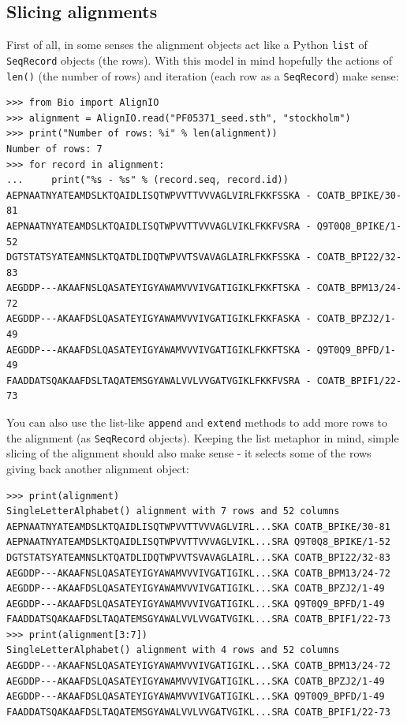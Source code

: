 \documentclass{report}
\begin{document}
\subsection{Slicing alignments}
First of all, in some senses the alignment objects act like a Python \verb|list| of
\verb|SeqRecord| objects (the rows). With this model in mind hopefully the actions
of \verb|len()| (the number of rows) and iteration (each row as a \verb|SeqRecord|)
make sense:

\begin{verbatim}
>>> from Bio import AlignIO
>>> alignment = AlignIO.read("PF05371_seed.sth", "stockholm")
>>> print("Number of rows: %i" % len(alignment))
Number of rows: 7
>>> for record in alignment:
...     print("%s - %s" % (record.seq, record.id))
AEPNAATNYATEAMDSLKTQAIDLISQTWPVVTTVVVAGLVIRLFKKFSSKA - COATB_BPIKE/30-81
AEPNAATNYATEAMDSLKTQAIDLISQTWPVVTTVVVAGLVIKLFKKFVSRA - Q9T0Q8_BPIKE/1-52
DGTSTATSYATEAMNSLKTQATDLIDQTWPVVTSVAVAGLAIRLFKKFSSKA - COATB_BPI22/32-83
AEGDDP---AKAAFNSLQASATEYIGYAWAMVVVIVGATIGIKLFKKFTSKA - COATB_BPM13/24-72
AEGDDP---AKAAFDSLQASATEYIGYAWAMVVVIVGATIGIKLFKKFASKA - COATB_BPZJ2/1-49
AEGDDP---AKAAFDSLQASATEYIGYAWAMVVVIVGATIGIKLFKKFTSKA - Q9T0Q9_BPFD/1-49
FAADDATSQAKAAFDSLTAQATEMSGYAWALVVLVVGATVGIKLFKKFVSRA - COATB_BPIF1/22-73
\end{verbatim}

You can also use the list-like \verb|append| and \verb|extend| methods to add
more rows to the alignment (as \verb|SeqRecord| objects). Keeping the list
metaphor in mind, simple slicing of the alignment should also make sense -
it selects some of the rows giving back another alignment object:

\begin{verbatim}
>>> print(alignment)
SingleLetterAlphabet() alignment with 7 rows and 52 columns
AEPNAATNYATEAMDSLKTQAIDLISQTWPVVTTVVVAGLVIRL...SKA COATB_BPIKE/30-81
AEPNAATNYATEAMDSLKTQAIDLISQTWPVVTTVVVAGLVIKL...SRA Q9T0Q8_BPIKE/1-52
DGTSTATSYATEAMNSLKTQATDLIDQTWPVVTSVAVAGLAIRL...SKA COATB_BPI22/32-83
AEGDDP---AKAAFNSLQASATEYIGYAWAMVVVIVGATIGIKL...SKA COATB_BPM13/24-72
AEGDDP---AKAAFDSLQASATEYIGYAWAMVVVIVGATIGIKL...SKA COATB_BPZJ2/1-49
AEGDDP---AKAAFDSLQASATEYIGYAWAMVVVIVGATIGIKL...SKA Q9T0Q9_BPFD/1-49
FAADDATSQAKAAFDSLTAQATEMSGYAWALVVLVVGATVGIKL...SRA COATB_BPIF1/22-73
>>> print(alignment[3:7])
SingleLetterAlphabet() alignment with 4 rows and 52 columns
AEGDDP---AKAAFNSLQASATEYIGYAWAMVVVIVGATIGIKL...SKA COATB_BPM13/24-72
AEGDDP---AKAAFDSLQASATEYIGYAWAMVVVIVGATIGIKL...SKA COATB_BPZJ2/1-49
AEGDDP---AKAAFDSLQASATEYIGYAWAMVVVIVGATIGIKL...SKA Q9T0Q9_BPFD/1-49
FAADDATSQAKAAFDSLTAQATEMSGYAWALVVLVVGATVGIKL...SRA COATB_BPIF1/22-73
\end{verbatim}
\end{document}
